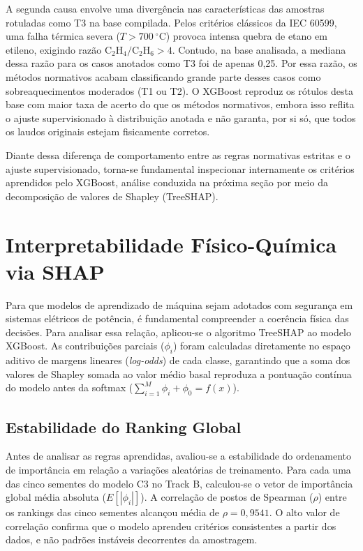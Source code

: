 A segunda causa envolve uma divergência nas características das amostras rotuladas como T3 na base compilada. Pelos critérios clássicos da IEC 60599, uma falha térmica severa ($T > 700\ ^\circ\text{C}$) provoca intensa quebra de etano em etileno, exigindo razão $\text{C}_2\text{H}_4/\text{C}_2\text{H}_6 > 4$. Contudo, na base analisada, a mediana dessa razão para os casos anotados como T3 foi de apenas 0,25. Por essa razão, os métodos normativos acabam classificando grande parte desses casos como sobreaquecimentos moderados (T1 ou T2). O XGBoost reproduz os rótulos desta base com maior taxa de acerto do que os métodos normativos, embora isso reflita o ajuste supervisionado à distribuição anotada e não garanta, por si só, que todos os laudos originais estejam fisicamente corretos.

Diante dessa diferença de comportamento entre as regras normativas estritas e o ajuste supervisionado, torna-se fundamental inspecionar internamente os critérios aprendidos pelo XGBoost, análise conduzida na próxima seção por meio da decomposição de valores de Shapley (TreeSHAP).

\section{Interpretabilidade Físico-Química via SHAP}\label{sec:res_shap}

Para que modelos de aprendizado de máquina sejam adotados com segurança em sistemas elétricos de potência, é fundamental compreender a coerência física das decisões. Para analisar essa relação, aplicou-se o algoritmo TreeSHAP \cite{lundberg2020} ao modelo XGBoost. As contribuições parciais ($\phi_i$) foram calculadas diretamente no espaço aditivo de margens lineares (\textit{log-odds}) de cada classe, garantindo que a soma dos valores de Shapley somada ao valor médio basal reproduza a pontuação contínua do modelo antes da softmax ($\sum_{i=1}^{M} \phi_i + \phi_0 = f(x)$).

\subsection{Estabilidade do Ranking Global}

Antes de analisar as regras aprendidas, avaliou-se a estabilidade do ordenamento de importância em relação a variações aleatórias de treinamento. Para cada uma das cinco sementes do modelo C3 no Track B, calculou-se o vetor de importância global média absoluta ($E[|\phi_i|]$). A correlação de postos de Spearman ($\rho$) entre os rankings das cinco sementes alcançou média de $\rho = 0,9541$. O alto valor de correlação confirma que o modelo aprendeu critérios consistentes a partir dos dados, e não padrões instáveis decorrentes da amostragem.

